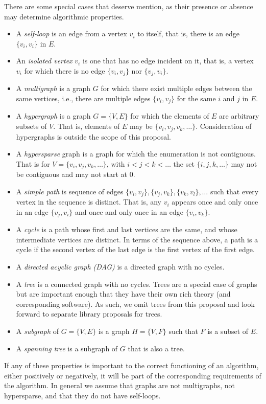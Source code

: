 There are some special cases that deserve mention, as their presence or absence may determine algorithmic properties.
\begin{itemize}
%
\item A \emph{self-loop} is an edge from a vertex $v_i$ to itself, that is, there is an edge $\{v_i, v_i\}$ in $E$.
%
\item An \emph{isolated vertex} $v_i$ is one that has no edge incident on it, that is, a vertex $v_i$ for which there is no edge $\{v_i, v_j\}$ nor $\{v_j, v_i\}$.
%
\item A \emph{multigraph} is a graph $G$ for which there exist multiple edges between the same vertices, i.e., there are
  multiple edges $\{v_i, v_j\}$ for the same $i$ and $j$ in $E$. 
%
\item A \emph{hypergraph} is a graph $G=\{V,E\}$ for which the elements of $E$ are arbitrary subsets of $V$.  That is,
  elements of $E$ may be $\{v_i, v_j, v_k, \ldots\}$.  Consideration of hypergraphs is outside the scope of this
  proposal.
\item A \emph{hypersparse} graph is a graph for which the enumeration is not contiguous.  That is for $V = \{v_i, v_j, v_k, \ldots\}$, with $i < j < k < \ldots$ the set $\{i, j, k, \ldots\}$ may not be contiguous and may not start at $0$.
\item A \emph{simple path} is sequence of edges $\{v_i, v_j\}, \{v_j, v_k\}, \{v_k, v_l\}, \ldots $ such that every vertex in the sequence is distinct.
  That is,
any $v_i$ appears once and only once in an edge $\{v_j, v_i\}$ and once and only once in an
edge $\{v_i, v_k\}$.
\item A \emph{cycle} is a path whose first and last vertices are the same, and whose intermediate vertices are distinct.
  In terms of the sequence above, a path is a cycle if the second vertex of the last edge is the first vertex of the first edge.
\item  A \emph{directed acyclic graph (DAG)} is a directed graph with no cycles.
\item A \emph{tree} is a connected graph with no cycles.  Trees are a special case of graphs but are important enough that they have their own
  rich theory (and corresponding software).  As such, we omit trees from this proposal and look forward to
  separate library proposals for trees.
  \item A \emph{subgraph} of $G=\{V,E\}$ is a graph $H=\{V, F\}$ such that $F$ is a subset of $E$.
\item A \emph{spanning tree} is a subgraph of $G$ that is also a tree.
\end{itemize}
If any of these properties is important to the correct functioning of an algorithm, either positively or negatively, it will be part of the corresponding requirements of the algorithm.  In general we assume that graphs are not multigraphs, not hypersparse, and that they do not have self-loops.

